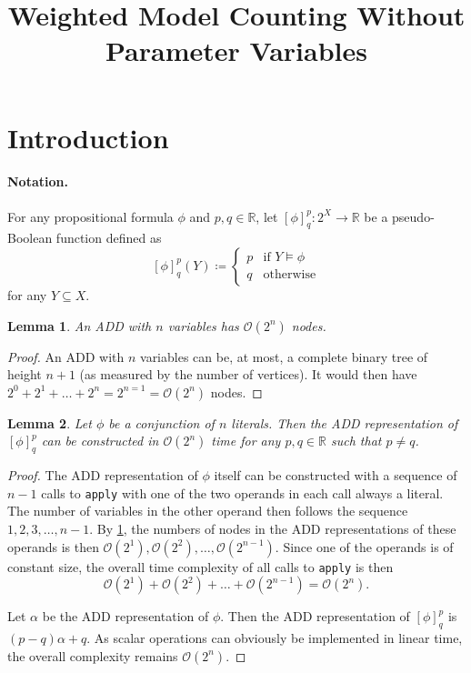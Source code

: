 \documentclass{article}
\title{Weighted Model Counting Without Parameter Variables}
\newtheorem{lemma}{Lemma}
\theoremstyle{definition}
\theoremstyle{remark}
\begin{document}
\maketitle

\section{Introduction}

\paragraph{Notation.} For any propositional formula $\phi$ and $p, q \in
\mathbb{R}$, let $[\phi]^p_q\colon 2^X \to \mathbb{R}$ be a
pseudo-Boolean function defined as
\[
  [\phi]^p_q(Y) \coloneqq
  \begin{cases}
    p & \text{if } Y \models \phi \\
    q & \text{otherwise}
  \end{cases}
\]
for any $Y \subseteq X$.

\begin{lemma} \label{lemma:add_size}
  An ADD with $n$ variables has $\mathcal{O}(2^n)$ nodes.
\end{lemma}
\begin{proof}
  An ADD with $n$ variables can be, at most, a complete binary tree of height
  $n+1$ (as measured by the number of vertices). It would then have $2^0 + 2^1 +
  \dots + 2^n = 2^{n=1} = \mathcal{O}(2^n)$ nodes.
\end{proof}

\begin{lemma}
  Let $\phi$ be a conjunction of $n$ literals. Then the ADD representation of
  $[\phi]^p_q$ can be constructed in $\mathcal{O}(2^n)$ time for any $p, q \in
  \mathbb{R}$ such that $p \ne q$.
\end{lemma}
\begin{proof}
  The ADD representation of $\phi$ itself can be constructed with a sequence of
  $n-1$ calls to \texttt{apply} with one of the two operands in each call always
  a literal. The number of variables in the other operand then follows the
  sequence $1, 2, 3, \dots, n-1$. By \cref{lemma:add_size}, the numbers of nodes
  in the ADD representations of these operands is then $\mathcal{O}(2^1),
  \mathcal{O}(2^2), \dots, \mathcal{O}(2^{n-1})$. Since one of the operands is
  of constant size, the overall time complexity of all calls to \texttt{apply}
  is then
  \[
    \mathcal{O}(2^1) + \mathcal{O}(2^2) + \dots + \mathcal{O}(2^{n-1}) =
    \mathcal{O}(2^n).
  \]

  Let $\alpha$ be the ADD representation of $\phi$. Then the ADD representation
  of $[\phi]_q^p$ is $(p-q)\alpha + q$. As scalar operations can obviously be
  implemented in linear time, the overall complexity remains $\mathcal{O}(2^n)$.
\end{proof}
\end{document}
